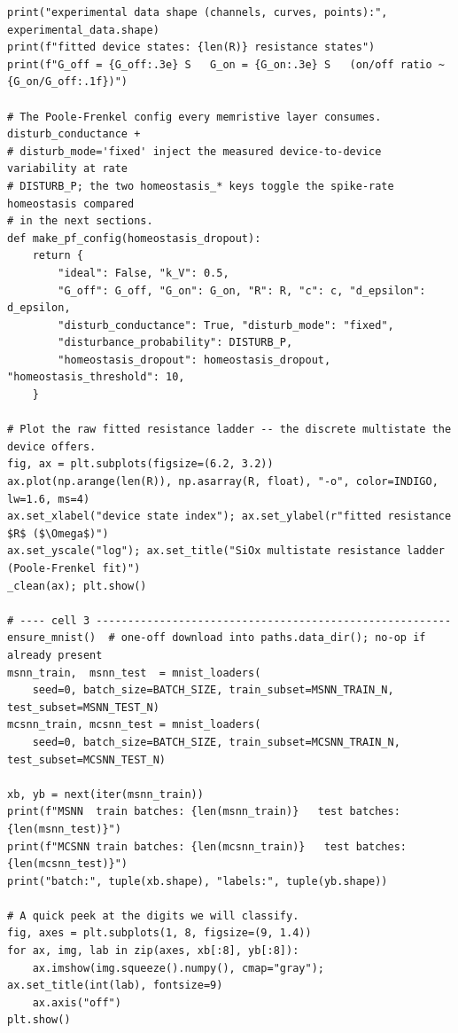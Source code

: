 \begin{lstlisting}[caption={experiments/examples.ipynb},label={lst:mnn-nb-examples}]
print("experimental data shape (channels, curves, points):", experimental_data.shape)
print(f"fitted device states: {len(R)} resistance states")
print(f"G_off = {G_off:.3e} S   G_on = {G_on:.3e} S   (on/off ratio ~ {G_on/G_off:.1f})")

# The Poole-Frenkel config every memristive layer consumes. disturb_conductance +
# disturb_mode='fixed' inject the measured device-to-device variability at rate
# DISTURB_P; the two homeostasis_* keys toggle the spike-rate homeostasis compared
# in the next sections.
def make_pf_config(homeostasis_dropout):
    return {
        "ideal": False, "k_V": 0.5,
        "G_off": G_off, "G_on": G_on, "R": R, "c": c, "d_epsilon": d_epsilon,
        "disturb_conductance": True, "disturb_mode": "fixed",
        "disturbance_probability": DISTURB_P,
        "homeostasis_dropout": homeostasis_dropout, "homeostasis_threshold": 10,
    }

# Plot the raw fitted resistance ladder -- the discrete multistate the device offers.
fig, ax = plt.subplots(figsize=(6.2, 3.2))
ax.plot(np.arange(len(R)), np.asarray(R, float), "-o", color=INDIGO, lw=1.6, ms=4)
ax.set_xlabel("device state index"); ax.set_ylabel(r"fitted resistance $R$ ($\Omega$)")
ax.set_yscale("log"); ax.set_title("SiOx multistate resistance ladder (Poole-Frenkel fit)")
_clean(ax); plt.show()

# ---- cell 3 --------------------------------------------------------
ensure_mnist()  # one-off download into paths.data_dir(); no-op if already present
msnn_train,  msnn_test  = mnist_loaders(
    seed=0, batch_size=BATCH_SIZE, train_subset=MSNN_TRAIN_N,  test_subset=MSNN_TEST_N)
mcsnn_train, mcsnn_test = mnist_loaders(
    seed=0, batch_size=BATCH_SIZE, train_subset=MCSNN_TRAIN_N, test_subset=MCSNN_TEST_N)

xb, yb = next(iter(msnn_train))
print(f"MSNN  train batches: {len(msnn_train)}   test batches: {len(msnn_test)}")
print(f"MCSNN train batches: {len(mcsnn_train)}   test batches: {len(mcsnn_test)}")
print("batch:", tuple(xb.shape), "labels:", tuple(yb.shape))

# A quick peek at the digits we will classify.
fig, axes = plt.subplots(1, 8, figsize=(9, 1.4))
for ax, img, lab in zip(axes, xb[:8], yb[:8]):
    ax.imshow(img.squeeze().numpy(), cmap="gray"); ax.set_title(int(lab), fontsize=9)
    ax.axis("off")
plt.show()


\end{lstlisting}
